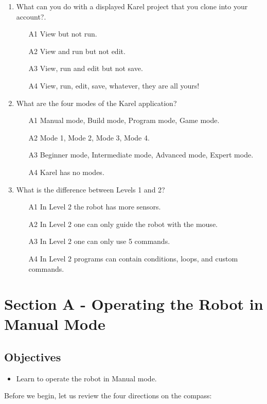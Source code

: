 \documentclass[article,A4,12pt]{llncs}
\begin{document}
\begin{enumerate}
\item What can you do with a displayed Karel project that you clone into your account?.
\begin{enumerate}
\item[A1] View but not run.
\item[A2] View and run but not edit.
\item[A3] View, run and edit but not save.
\item[A4] View, run, edit, save, whatever, they are all yours!
\end{enumerate}
\item What are the four modes of the Karel application?
\begin{enumerate}
\item[A1] Manual mode, Build mode, Program mode, Game mode.
\item[A2] Mode 1, Mode 2, Mode 3, Mode 4.
\item[A3] Beginner mode, Intermediate mode, Advanced mode, Expert mode.
\item[A4] Karel has no modes.
\end{enumerate}
\item What is the difference between Levels 1 and 2?
\begin{enumerate}
\item[A1] In Level 2 the robot has more sensors. 
\item[A2] In Level 2 one can only guide the robot with the mouse.
\item[A3] In Level 2 one can only use 5 commands.
\item[A4] In Level 2 programs can contain 
      conditions, loops, and custom commands.
\end{enumerate}
\end{enumerate}


\section{Section A - Operating the Robot in Manual Mode}

\subsection{Objectives} 
\begin{itemize}
\item Learn to operate the robot in Manual mode.
\end{itemize}
\noindent
Before we begin, let us review the four directions on the compass:
\end{document}
